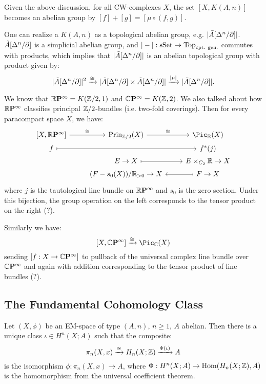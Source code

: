 

Given the above discussion, for all CW-complexes $X$, the set $[X,K(A,n)]$ becomes an abelian group by $[f]+[g]=[\mu\circ(f,g)]$.

\begin{remark}
One can realize a $K(A,n)$ as a topological abelian group, e.g. $|\tilde A[\Delta^n/\partial]|$. $\tilde A[\Delta^n/\partial]$ is a simplicial abelian group, and $|-|:{\mathrm{sSet}}\to{\mathrm{Top}}_\text{cpt. gen.}$ commutes with products, which implies that $|\tilde A[\Delta^n/\partial]|$ is an abelian topological group with product given by:
\[|\tilde A[\Delta^n/\partial]|^2\xrightarrow{\cong}|\tilde A[\Delta^n/\partial]\times\tilde A[\Delta^n/\partial]|\xrightarrow{|\mu|}|\tilde A[\Delta^n/\partial]|.\]
\end{remark}

\begin{example}
We know that ${{\mathbb R}\mathbf{P}^{\infty}}=K({\mathbb Z}/2,1)$ and ${\mathbb{C}\mathbf{P}^{\infty}}=K({\mathbb Z},2)$. We also talked about how ${{\mathbb R}\mathbf{P}^{\infty}}$ classifies principal ${\mathbb Z}/2$-bundles (i.e. two-fold coverings). Then for every paracompact space $X$, we have:
\[
\begin{tikzcd}
    \left[X,\rp{\infty}\right] \ar[r,"\cong"] & \operatorname{Prin}_{\Z/2}(X) \ar[r,"\cong"] & \Pic_\R(X)\\[-4ex]
    f \ar[rr,mapsto] & & f^* (j)\\[-4ex]
    & E\to X \ar[r,mapsto] & E\times_{C_2}\R\to X\\[-4ex]
    & (F-s_0(X))/\R_{>0}\to X & F\to X \ar[l,mapsto]
\end{tikzcd}
\]
where $j$ is the tautological line bundle on ${{\mathbb R}\mathbf{P}^{\infty}}$ and $s_0$ is the zero section. Under this bijection, the group operation on the left corresponds to the tensor product on the right (?).

Similarly we have:
\[[X,\cp{\infty}]\xto{\cong}\Pic_\CC(X)\]
sending $[f:X\to{\mathbb{C}\mathbf{P}^{\infty}}]$ to pullback of the universal complex line bundle over ${\mathbb{C}\mathbf{P}^{\infty}}$ and again with addition corresponding to the tensor product of line bundles (?).
\end{example}

\subsection{The Fundamental Cohomology Class}

\begin{propdef}\label{propdef:fundamental-cohomology-class}
Let $(X,\phi)$ be an EM-space of type $(A,n)$, $n\ge1$, $A$ abelian. Then there is a unique class $\iota\in H^n(X;A)$ such that the composite:
\[\pi_n(X,x)\xrightarrow{\cong}H_n(X;{\mathbb Z})\xrightarrow{\Phi(\iota)}A\]
is the isomorphism $\phi:\pi_n(X,x)\to A$, where $\Phi:H^n(X;A)\to\operatorname{Hom}(H_n(X;{\mathbb Z}),A)$ is the homomorphism from the universal coefficient theorem.
\end{propdef}

